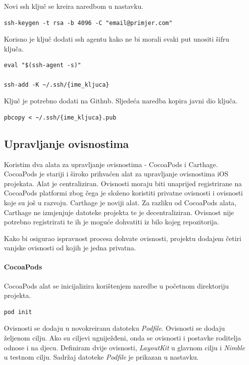 \documentclass[times, utf8, diplomski, numeric]{fer}
\begin{document}
\begin{appendices}
Novi ssh ključ se kreira naredbom u nastavku.

\begin{verbatim}
ssh-keygen -t rsa -b 4096 -C "email@primjer.com"
\end{verbatim}

Korisno je ključ dodati ssh agentu kako ne bi morali svaki put unositi šifru ključa.

\begin{verbatim}
eval "$(ssh-agent -s)"

ssh-add -K ~/.ssh/{ime_kljuca}
\end{verbatim}

Ključ je potrebno dodati na Github. Sljedeća naredba kopira javni dio ključa.

\begin{verbatim}
pbcopy < ~/.ssh/{ime_kljuca}.pub
\end{verbatim}


\subsection{Upravljanje ovisnostima}

Koristim dva alata za upravljanje ovisnostima - CocoaPods i Carthage. CocoaPods je stariji i široko prihvaćen alat za upravljanje ovisnostima iOS projekata. Alat je centraliziran. Ovisnosti moraju biti unaprijed registrirane na CocoaPods platformi zbog čega je složeno koristiti privatne ovisnosti i ovisnosti koje su još u razvoju. Carthage je noviji alat. Za razliku od CocoaPods alata, Carthage ne izmjenjuje datoteke projekta te je decentraliziran. Ovisnost nije potrebno registrirati te ih je moguće dohvatiti iz bilo kojeg repozitorija.

Kako bi osigurao ispravnost procesa dohvate ovisnosti, projektu dodajem četiri vanjske ovisnosti od kojih je jedna privatna.

\paragraph{CocoaPods}

CocoaPods alat se inicijalizira korištenjem naredbe u početnom direktoriju projekta.

\begin{verbatim}
pod init
\end{verbatim}

Ovisnosti se dodaju u novokreiranu datoteku \textit{Podfile}. Ovisnosti se dodaju željenom cilju. Ako su ciljevi ugniježđeni, onda se ovisnosti i postavke roditelja odnose i na djecu. Definiram dvije ovisnosti, \textit{LayoutKit} u glavnom cilju i \textit{Nimble} u testnom cilju. Sadržaj datoteke \textit{Podfile} je prikazan u nastavku.


\end{appendices}
\end{document}
